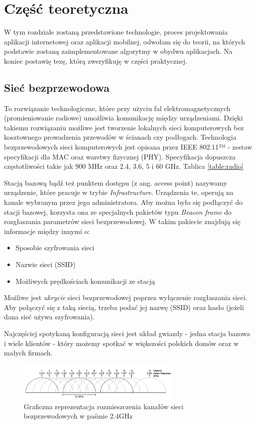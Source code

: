 \chapter{Część teoretyczna}

W tym rozdziale zostaną przedstawione technologie, proces projektowania aplikacji internetowej oraz aplikacji mobilnej, odwołam się do teorii, na których podstawie zostaną zaimplementowane algorytmy w obydwu aplikacjach. Na koniec postawię tezę, którą zweryfikuję w części praktycznej.

\section{Sieć bezprzewodowa}
To rozwiązanie technologiczne, które przy użyciu fal elektromagnetycznych (promieniowanie radiowe) umożliwia komunikację między urządzeniami. Dzięki takiemu rozwiązaniu możliwe jest tworzenie lokalnych sieci komputerowych bez kosztownego prowadzenia przewodów w ścianach czy podłogach. Technologia bezprzewodowych sieci komputerowych jest opisana przez IEEE 802.11™ - zestaw specyfikacji dla MAC oraz warstwy fizycznej (PHY). Specyfikacja dopuszcza częstotliwości takie jak 900 MHz oraz 2.4, 3.6, 5 i 60 GHz. Tablica \ref{table:radio}

Stacją bazową bądź też punktem dostępu (z ang. access point) nazywamy urządzenie, które pracuje w trybie \textit{Infrastructure}. Urządzenia te, operują na kanale wybranym przez jego administratora. Aby można było się podłączyć do stacji bazowej, korzysta ona ze specjalnych pakietów typu \textit{Beacon frame} do rozgłaszania parametrów sieci bezprzewodowej. W takim pakiecie znajdują się informacje między innymi o:
\begin{itemize}
    \item Sposobie szyfrowania sieci
    \item Nazwie sieci (SSID)
    \item Możliwych prędkościach komunikacji ze stacją
\end{itemize}

Możliwe jest \textit{ukrycie} sieci bezprzewodowej poprzez wyłączenie rozgłaszania sieci. Aby połączyć się z taką siecią, trzeba podać jej nazwę (SSID) oraz hasło (jeżeli dana sieć używa szyfrowania).

Najczęściej spotykaną konfiguracją sieci jest układ gwiazdy - jedna stacja bazowa i wiele klientów - który możemy spotkać w większości polskich domów oraz w małych firmach. 

\begin{figure}[h!]
  \centering
    \includegraphics[width=8cm]{images/wifi_channels}
  \caption{Graficzna reprezentacja rozmieszczenia kanałów sieci bezprzewodowych w paśmie 2.4GHz}
  \label{fig:wifiChannels}
\end{figure}

